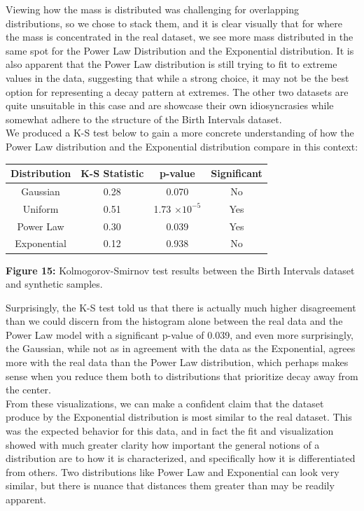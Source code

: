 Viewing how the mass is distributed was challenging for overlapping distributions, so we chose to stack them, and it is clear visually that for where the mass is concentrated in the real dataset, we see more mass distributed in the same spot for the Power Law Distribution and the Exponential distribution. It is also apparent that the Power Law distribution is still trying to fit to extreme values in the data, suggesting that while a strong choice, it may not be the best option for representing a decay pattern at extremes. The other two datasets are quite unsuitable in this case and are showcase their own idiosyncrasies while somewhat adhere to the structure of the Birth Intervals dataset.\\

We produced a K-S test below to gain a more concrete understanding of how the Power Law distribution and the Exponential distribution compare in this context:

\begin{center}
\begin{tabular}{|c|c|c|c|}
\hline
\textbf{Distribution} & \textbf{K-S Statistic} & \textbf{p-value} & \textbf{Significant} \\
\hline
Gaussian & 0.28 & 0.070 & No \\
\hline
Uniform & 0.51 & 1.73 $\times 10^{-5}$ & Yes \\
\hline
Power Law & 0.30 & 0.039 & Yes \\
\hline
Exponential & 0.12 & 0.938 & No \\
\hline
\end{tabular}
\end{center}

\begin{center}
\textbf{Figure 15:} Kolmogorov-Smirnov test results between the Birth Intervals dataset and synthetic samples.
\end{center}

Surprisingly, the K-S test told us that there is actually much higher disagreement than we could discern from the histogram alone between the real data and the Power Law model with a significant p-value of 0.039, and even more surprisingly, the Gaussian, while not as in agreement with the data as the Exponential, agrees more with the real data than the Power Law distribution, which perhaps makes sense when you reduce them both to distributions that prioritize decay away from the center.\\

From these visualizations, we can make a confident claim that the dataset produce by the Exponential distribution is most similar to the real dataset. This was the expected behavior for this data, and in fact the fit and visualization showed with much greater clarity how important the general notions of a distribution are to how it is characterized, and specifically how it is differentiated from others. Two distributions like Power Law and Exponential can look very similar, but there is nuance that distances them greater than may be readily apparent.
